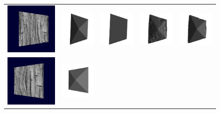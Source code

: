 \begin{figure}[t]
\setlength{\tabcolsep}{1px}
\centering
\begin{tabular}{ccccc}
\includegraphics[height=0.18\textwidth]{./img/datasetSweepIMG0}&
\includegraphics[height=0.18\textwidth]{./img/synthGT1}&
\includegraphics[height=0.18\textwidth]{./img/synthInit1}&
\includegraphics[height=0.18\textwidth]{./img/synthNOtRef1}&
\includegraphics[height=0.18\textwidth]{./img/synthRef1}\\
\includegraphics[height=0.18\textwidth]{./img/datasetSweepIMG1synth2}&
\includegraphics[height=0.18\textwidth]{./img/synth2_GT}&

\end{tabular}
\end{figure}
